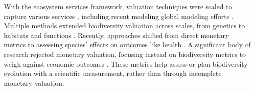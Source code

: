 With the ecosystem services framework, valuation techniques were scaled to capture various services \citep{Costanza1997}, including recent modeling global modeling efforts \citep{giglio_economics_2024}. Multiple methods extended biodiversity valuation across scales, from genetics to habitats and functions \citep{bartkowski_capturing_2015}.
Recently, approaches shifted from direct monetary metrics to assessing species' effects on outcomes like health \citep{frank_social_nodate,frank_economic_2024}. A significant body of research rejected monetary valuation, focusing instead on biodiversity metrics to weigh against economic outcomes \citep{Mouysset2011, Watzold2016a}. These metrics help assess or plan biodiversity evolution with a scientific measurement, rather than through incomplete monetary valuation. 

